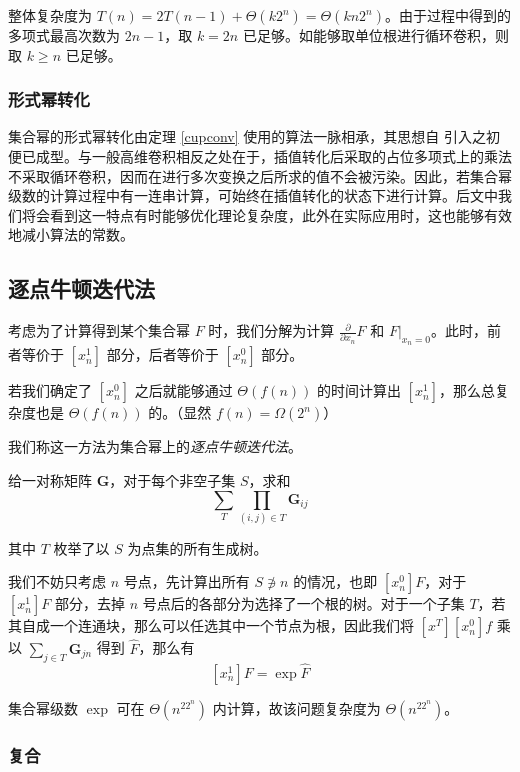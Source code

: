 整体复杂度为 $T(n)=2T(n-1)+\Theta(k2^n)=\Theta(kn2^n)$。由于过程中得到的多项式最高次数为 $2n-1$，取 $k=2n$ 已足够。如能够取单位根进行循环卷积，则取 $k\ge n$ 已足够。

\subsubsection{形式幂转化}

集合幂的形式幂转化由定理 \ref{cupconv} 使用的算法一脉相承，其思想自 \cite{vfk} 引入之初便已成型。与一般高维卷积相反之处在于，插值转化后采取的占位多项式上的乘法不采取循环卷积，因而在进行多次变换之后所求的值不会被污染。因此，若集合幂级数的计算过程中有一连串计算，可始终在插值转化的状态下进行计算。后文中我们将会看到这一特点有时能够优化理论复杂度，此外在实际应用时，这也能够有效地减小算法的常数。

\subsection{逐点牛顿迭代法}

考虑为了计算得到某个集合幂 $F$ 时，我们分解为计算 $\frac{\partial}{\partial x_n} F$ 和 $\left . F \right |_{x_n=0}$。此时，前者等价于 $[x_n^1]$ 部分，后者等价于 $[x_n^0]$ 部分。

若我们确定了 $[x_n^0]$ 之后就能够通过 $\Theta(f(n))$ 的时间计算出 $[x_n^1]$，那么总复杂度也是 $\Theta(f(n))$ 的。（显然 $f(n) = \Omega(2^n)$）

我们称这一方法为集合幂上的\emph{逐点牛顿迭代法}。

\begin{problem}[无根树计数]
给一对称矩阵 $\mathbf G$，对于每个非空子集 $S$，求和
$$
\sum_T \prod_{(i, j) \in T} \mathbf G_{ij}
$$

其中 $T$ 枚举了以 $S$ 为点集的所有生成树。
\end{problem}

\begin{solution}
我们不妨只考虑 $n$ 号点，先计算出所有 $S\not \ni n$ 的情况，也即 $[x_n^0]F$，对于 $[x_n^1]F$ 部分，去掉 $n$ 号点后的各部分为选择了一个根的树。对于一个子集 $T$，若其自成一个连通块，那么可以任选其中一个节点为根，因此我们将 $[x^T][x_n^0]f$ 乘以 $\sum_{j\in T} \mathbf G_{jn}$ 得到 $\widehat F$，那么有
$$
[x_n^1]F = \exp \widehat F
$$

集合幂级数 $\exp$ 可在 $\Theta(n^22^n)$ 内计算，故该问题复杂度为 $\Theta(n^22^n)$。
\end{solution}

\subsubsection{复合}

